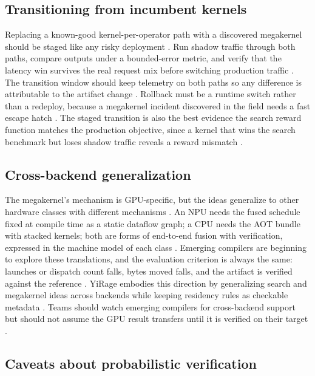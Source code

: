 \subsection{Transitioning from incumbent kernels}

Replacing a known-good kernel-per-operator path with a discovered megakernel should be staged like any risky deployment \citep{mpk2025,patel2025llminference}. Run shadow traffic through both paths, compare outputs under a bounded-error metric, and verify that the latency win survives the real request mix before switching production traffic \citep{wu2024mirage,memoryfloor2026}. The transition window should keep telemetry on both paths so any difference is attributable to the artifact change \citep{patel2025llminference,taxbreak2026}. Rollback must be a runtime switch rather than a redeploy, because a megakernel incident discovered in the field needs a fast escape hatch \citep{mpk2025,chen2020compilerbasedhardw}. The staged transition is also the best evidence the search reward function matches the production objective, since a kernel that wins the search benchmark but loses shadow traffic reveals a reward mismatch \citep{wu2024mirage,taxbreak2026}.

\subsection{Cross-backend generalization}

The megakernel's mechanism is GPU-specific, but the ideas generalize to other hardware classes with different mechanisms \citep{wu2024mirage,amd2024xdna,rotem2018glow}. An NPU needs the fused schedule fixed at compile time as a static dataflow graph; a CPU needs the AOT bundle with stacked kernels; both are forms of end-to-end fusion with verification, expressed in the machine model of each class \citep{amd2024xdna,rotem2018glow,dlbook}. Emerging compilers are beginning to explore these translations, and the evaluation criterion is always the same: launches or dispatch count falls, bytes moved falls, and the artifact is verified against the reference \citep{wu2024mirage,memoryfloor2026}. YiRage embodies this direction by generalizing search and megakernel ideas across backends while keeping residency rules as checkable metadata \citep{yirage2026}. Teams should watch emerging compilers for cross-backend support but should not assume the GPU result transfers until it is verified on their target \citep{patel2025llminference,taxbreak2026}.

\subsection{Caveats about probabilistic verification}

